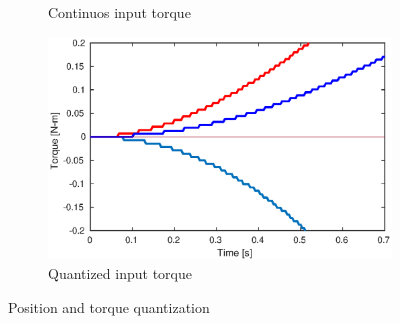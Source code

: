 \documentclass[a4paper, 10pt]{article}
\begin{document}
\begin{figure}
\begin{subfigure}[b]{0.4\textwidth}
    \caption{Continuos input torque}
    \label{fig:torque_quantized1}
  \end{subfigure}
  \begin{subfigure}[b]{0.4\textwidth}
    \centering
    \includegraphics[width=\textwidth]{Figures/torque_quantized2.eps}
    \caption{Quantized input torque}
    \label{fig:torque_quantized2}
  \end{subfigure}
  \caption{Position and torque quantization}
  \label{fig:quantization}
\end{figure}
\end{document}
